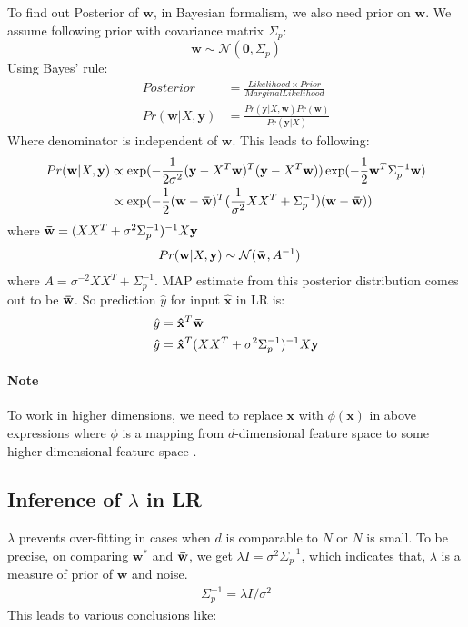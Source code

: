 \documentclass[12pt]{article}
\begin{document}
To find out Posterior of $\mathbf{w}$, in Bayesian formalism, we also need prior on $\mathbf{w}$. We assume following prior with covariance matrix $\Sigma_p$:
$$\mathbf{w} \sim \mathcal{N}(\mathbf{0}, \Sigma_p)$$
Using Bayes' rule:
\begin{align}
    Posterior &= \frac{Likelihood \times Prior}{Marginal Likelihood} \nonumber \\
    Pr(\mathbf{w}| X, \mathbf{y}) &= \frac{Pr(\mathbf{y}| X, \mathbf{w}) Pr(\mathbf{w})}{Pr(\mathbf{y}|X)} \nonumber
\end{align}
Where denominator is independent of $\mathbf{w}$. This leads to following:
\begin{align}
    Pr(\mathbf{w} | X, \mathbf{y}) &\propto \exp(- \frac{1}{2\sigma^2}(\mathbf{y}-X^T\mathbf{w})^T (\mathbf{y}-X^T\mathbf{w})) \exp(-\frac{1}{2}\mathbf{w}^T\Sigma_p^{-1}\mathbf{w}) \nonumber \\
    &\propto \exp(-\frac{1}{2}(\mathbf{w-\Bar{w}})^T (\frac{1}{\sigma^2}XX^T + \Sigma_p^{-1}) (\mathbf{w-\Bar{w}})) \nonumber \\
\end{align}
where $\mathbf{\Bar{w}} = (XX^T + \sigma^2\Sigma^{-1}_p)^{-1}X\mathbf{y}$
\begin{align}
    Pr(\mathbf{w} | X, \mathbf{y}) & \sim \mathcal{N}(\mathbf{\Bar{w}}, A^{-1})
    \label{eqn:post_w}
\end{align}
where $A = \sigma^{-2} XX^T + \Sigma_p^{-1}$. MAP estimate from this posterior distribution comes out to be $\mathbf{\Bar{w}}$. So prediction $\hat{y}$ for input $\mathbf{\hat{x}}$ in LR is:
\begin{align}
    \hat{y} &= \mathbf{\hat{x}}^T \mathbf{\Bar{w}} \nonumber \\
    \hat{y} &=  \mathbf{\hat{x}}^T (XX^T + \sigma^2\Sigma^{-1}_p)^{-1}X\mathbf{y}
\end{align}
\paragraph{Note} To work in higher dimensions, we need to replace $\mathbf{x}$ with $\phi(\mathbf{x})$ in above expressions where $\phi$ is a mapping from $d$-dimensional feature space to some higher dimensional feature space \cite{rasmussen}.

\subsection{Inference of $\lambda$ in LR}   
$\lambda$ prevents over-fitting in cases when $d$ is comparable to $N$ or $N$ is small. To be precise, on comparing $\mathbf{w^*}$ and $\mathbf{\Bar{w}}$, we get $\lambda I = \sigma^2 \Sigma_p^{-1}$, which indicates that, $\lambda$ is a measure of prior of $\mathbf{w}$ and noise. 
\begin{align}
    \Sigma_p^{-1} = \lambda I / \sigma^2
\end{align}
This leads to various conclusions like: 
\end{document}

